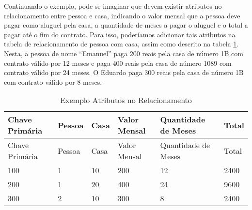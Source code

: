 Continuando o exemplo, pode-se imaginar que devem existir atributos no relacionamento entre pessoa e casa, indicando o valor mensal que a pessoa deve pagar como aluguel pela casa, a quantidade de meses a pagar o aluguel e o total a pagar até o fim do contrato. Para isso, poderíamos adicionar tais atributos na tabela de relacionamento de pessoa com casa, assim como descrito na tabela \ref{tab: atributos-relacionamento}. Nesta, a pessoa de nome ``Emanuel'' paga 200 reais pela casa de número 1B com contrato válido por 12 meses e paga 400 reais pela casa de número 1089 com contrato válido por 24 meses. O Eduardo paga 300 reais pela casa de número 1B com contrato válido por 8 meses.

\begin{longtable}[]{@{}llllll@{}}
\caption{Exemplo Atributos no Relacionamento \label{tab: atributos-relacionamento}}\tabularnewline
\toprule
Chave Primária & Pessoa & Casa & Valor Mensal & Quantidade de Meses & Total\tabularnewline
\midrule
\endfirsthead
\toprule
Chave Primária & Pessoa & Casa & Valor Mensal & Quantidade de Meses & Total\tabularnewline
\midrule
\endhead
100 & 1 & 10 & 200 & 12 & 2400\tabularnewline
200 & 1 & 20 & 400 & 24 & 9600\tabularnewline
300 & 2 & 10 & 300 & 8  & 2400\tabularnewline
\bottomrule
\end{longtable}

